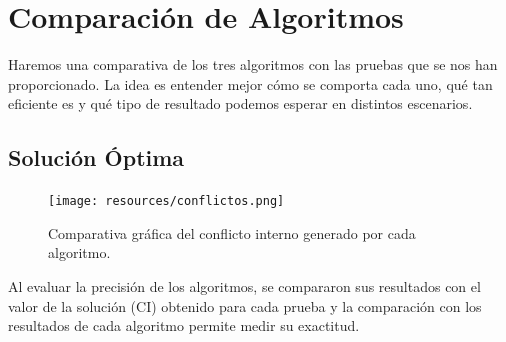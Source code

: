 \documentclass[11pt,letter]{article}
\begin{document}

    \newpage



    \section{Comparación de Algoritmos}

    Haremos una comparativa de los tres algoritmos con las pruebas que se nos han proporcionado. La idea es entender mejor cómo se comporta cada uno, qué tan eficiente es y qué tipo de resultado podemos esperar en distintos escenarios.

    \subsection{Solución Óptima}

    \begin{figure}[H]
        \centering
        \texttt{[image: resources/conflictos.png]}
        \caption{Comparativa gráfica del conflicto interno generado por cada algoritmo.}
    \end{figure}

    Al evaluar la precisión de los algoritmos, se compararon sus resultados con el valor de la solución (CI) obtenido para cada prueba y la comparación con los resultados de cada algoritmo permite medir su exactitud.
\end{document}
